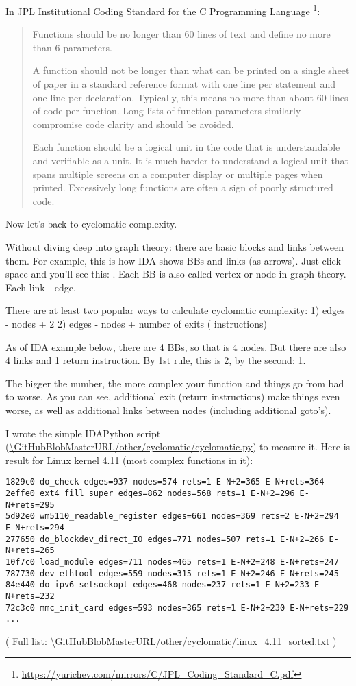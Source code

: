 In JPL Institutional Coding Standard for the C Programming Language
\footnote{\url{https://yurichev.com/mirrors/C/JPL_Coding_Standard_C.pdf}}:

\begin{framed}
\begin{quotation}
Functions should be no longer than 60 lines of text and define no more than 6 parameters.

A function should not be longer than what can be printed on a single sheet of paper in a standard reference format with one line per statement and one line per declaration. Typically, this means no more than about 60 lines of code per function. Long lists of function parameters similarly compromise code clarity and should be avoided.

Each function should be a logical unit in the code that is understandable and verifiable as a unit. It is much harder to understand a logical unit that spans multiple screens on a computer display or multiple pages when printed. Excessively long functions are often a sign of poorly structured code.
\end{quotation}
\end{framed}

Now let's back to cyclomatic complexity.

Without diving deep into graph theory: there are basic blocks and links between them.
For example, this is how IDA shows \ac{BB}s and links (as arrows).
Just click space and you'll see this: .
Each \ac{BB} is also called vertex or node in graph theory. Each link - edge.

There are at least two popular ways to calculate cyclomatic complexity:
1) edges - nodes + 2
2) edges - nodes + number of exits ( instructions)

As of IDA example below, there are 4 \ac{BB}s, so that is 4 nodes. But there are also 4 links and 1 return instruction.
By 1st rule, this is 2, by the second: 1.

The bigger the number, the more complex your function and things go from bad to worse.
As you can see, additional exit (return instructions) make things even worse,
as well as additional links between nodes (including additional goto's).

I wrote the simple IDAPython script (\url{\GitHubBlobMasterURL/other/cyclomatic/cyclomatic.py}) to measure it.
Here is result for Linux kernel 4.11 (most complex functions in it):

\begin{lstlisting}
1829c0 do_check edges=937 nodes=574 rets=1 E-N+2=365 E-N+rets=364
2effe0 ext4_fill_super edges=862 nodes=568 rets=1 E-N+2=296 E-N+rets=295
5d92e0 wm5110_readable_register edges=661 nodes=369 rets=2 E-N+2=294 E-N+rets=294
277650 do_blockdev_direct_IO edges=771 nodes=507 rets=1 E-N+2=266 E-N+rets=265
10f7c0 load_module edges=711 nodes=465 rets=1 E-N+2=248 E-N+rets=247
787730 dev_ethtool edges=559 nodes=315 rets=1 E-N+2=246 E-N+rets=245
84e440 do_ipv6_setsockopt edges=468 nodes=237 rets=1 E-N+2=233 E-N+rets=232
72c3c0 mmc_init_card edges=593 nodes=365 rets=1 E-N+2=230 E-N+rets=229
...
\end{lstlisting}
( Full list: \url{\GitHubBlobMasterURL/other/cyclomatic/linux_4.11_sorted.txt} )

